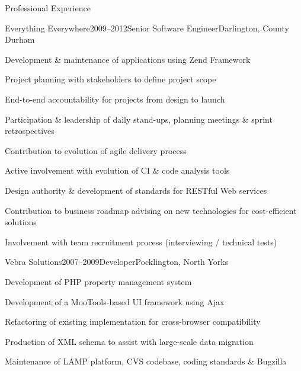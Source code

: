 \documentclass{cv}
\begin{document}
\begin{rSection}{Professional Experience}


\begin{rSubsection}{Everything Everywhere}{2009--2012}{Senior Software Engineer}{Darlington, County Durham}
\item Development \& maintenance of applications using Zend Framework
\item Project planning with stakeholders to define project scope
\item End-to-end accountability for projects from design to launch
\item Participation \& leadership of daily stand-ups, planning meetings \& sprint retrospectives
\item Contribution to evolution of agile delivery process
\item Active involvement with evolution of CI \& code analysis tools
\item Design authority \& development of standards for RESTful Web services
\item Contribution to business roadmap advising on new technologies for cost-efficient solutions
\item Involvement with team recruitment process (interviewing / technical tests)
\end{rSubsection}


\begin{rSubsection}{Vebra Solutions}{2007--2009}{Developer}{Pocklington, North Yorks}
\item Development of PHP property management system
\item Development of a MooTools-based UI framework using Ajax
\item Refactoring of existing implementation for cross-browser compatibility
\item Production of XML schema to assist with large-scale data migration
\item Maintenance of LAMP platform, CVS codebase, coding standards \& Bugzilla
\end{rSubsection}

\end{rSection}

\end{document}
